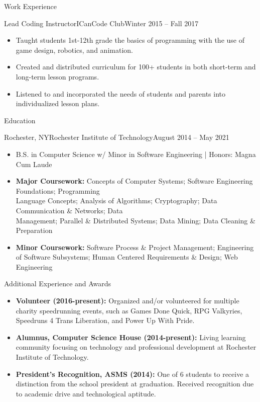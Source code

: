 \documentclass[]{mcdowellcv}
\begin{document}
\begin{cvsection}{Work Experience}
		\begin{cvsubsection}{Lead Coding Instructor}{ICanCode Club}{Winter 2015 -- Fall 2017}		
			\begin{itemize}
				\item Taught students 1st-12th grade the basics of programming with the use of game design, robotics, and animation.
				\item Created and distributed curriculum for 100+ students in both short-term and long-term lesson programs.
				\item Listened to and incorporated the needs of students and parents into individualized lesson plans.
			\end{itemize}
		\end{cvsubsection}	
	\end{cvsection}
	
	\begin{cvsection}{Education}
		\begin{cvsubsection}{Rochester, NY}{Rochester Institute of Technology}{August 2014 -- May 2021}
			\begin{itemize}
				\item B.S. in Computer Science w/ Minor in Software Engineering | Honors: Magna Cum Laude
				\item \textbf{Major Coursework:} Concepts of Computer Systems; Software Engineering Foundations; Programming \\Language Concepts; Analysis of Algorithms; Cryptography; Data Communication \& Networks; Data \\Management; Parallel \& Distributed Systems; Data Mining; Data Cleaning \& Preparation
				\item \textbf{Minor Coursework:} Software Process \& Project Management; Engineering of Software Subsystems; Human Centered Requirements \& Design; Web Engineering
			\end{itemize}
		\end{cvsubsection}
	\end{cvsection}
	
	\begin{cvsection}{Additional Experience and Awards}
		\begin{cvsubsection}{}{}{}	
			\begin{itemize}
				\item \textbf{Volunteer (2016-present):} Organized and/or volunteered for multiple charity speedrunning events, such as Games Done Quick, RPG Valkyries, Speedruns 4 Trans Liberation, and Power Up With Pride.
				\item \textbf{Alumnus, Computer Science House (2014-present):} Living learning community focusing on technology and professional development at Rochester Institute of Technology.
				\item \textbf{President's Recognition, ASMS (2014):} One of 6 students to receive a distinction from the school president at graduation. Received recognition due to academic drive and technological aptitude.
			\end{itemize}
		\end{cvsubsection}
	\end{cvsection}
	
\end{document}
